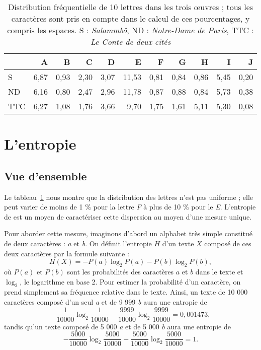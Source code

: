 \documentclass[]{article}
\begin{document}

\begin{table}[htdp]
\caption{Distribution fréquentielle de 10 lettres dans les trois œuvres ; tous les caractères sont pris en compte dans le calcul de ces pourcentages, y compris les espaces. S : \textit{Salammbô}, ND : \textit{Notre-Dame de Paris}, TTC : \textit{Le Conte de deux cités}}
\begin{center}\begin{tabular}{lrrrrrrrrrr}
\hline
&A&B&C&D&E&F&G&H&I&J\\
\hline
S&6,87& 0,93& 2,30&3,07&11,53&0,81&0,84&0,86& 5,45& 0,20\\
ND& 6,16&0,80&2,47& 2,96&11,78& 0,87&0,88&0,84&5,73& 0,38\\
TTC&6,27&1,08&1,76&3,66&9,70&1,75&1,61&5,11&5,30& 0,08\\
\hline
\end{tabular} 
\end{center}
\label{freq_rel}
\end{table}

\section{L'entropie}
\subsection{Vue d'ensemble}
Le tableau~\ref{freq_rel} nous montre que la distribution des lettres n'est pas uniforme ; elle peut varier de moins de 1 \% pour la lettre \textit{F} à plus de 10 \% pour le \textit{E}. L'entropie de \citet{Shannon1948} est un moyen de caractériser cette dispersion au moyen d'une mesure unique.

Pour aborder cette mesure, imaginons d'abord un alphabet très simple constitué de deux caractères : \textit{a} et \textit{b}. On définit l'entropie $H$ d'un texte $X$ composé de ces deux caractères par la formule suivante :
\[
H(X) = - P(a)\log _2 P(a) - P(b)\log _2 P(b),
\]
où $P(a)$ et $P(b)$ sont les probabilités des caractères $a$ et $b$ dans le texte et $\log_2$, le logarithme en base 2. Pour estimer la probabilité d'un caractère, on prend simplement sa fréquence relative dans le texte.
Ainsi, un texte de 10 000 caractères composé d'un seul \textit{a} et de 9 999 \textit{b} aura une entropie de 
\[
- \frac{1}{10 000} \log_2 \frac{1}{10 000} - \frac{9 999}{10 000} \log_2 \frac{9 999}{10 000} = 0,001473,
\]
 tandis qu'un texte composé de 5 000 \textit{a} et de 5 000 \textit{b} aura une entropie de 
 \[
 - \frac{5 000}{10 000} \log_2 \frac{5 000}{10 000} - \frac{5 000}{10 000} \log_2 \frac{5 000}{10 000} = 1.
 \]
\end{document}
